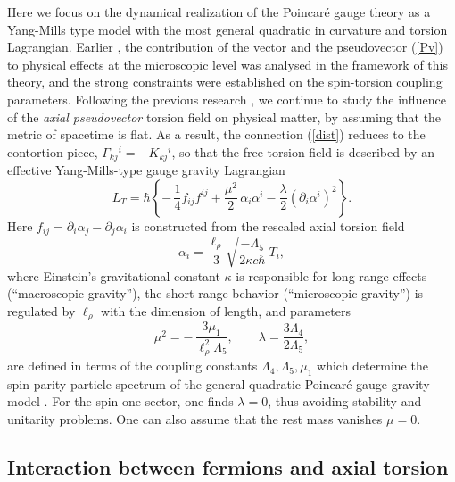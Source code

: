 \documentclass[12pt,prd,showkeys,amsmath,amssymb,nofootinbib]{revtex4-1}
\begin{document}
Here we focus on the dynamical realization of the Poincar\'e gauge theory as a Yang-Mills type model \cite{Poincare2} with the most general quadratic in curvature and torsion Lagrangian. Earlier \cite{Yakushin}, the contribution of the vector and the pseudovector (\ref{Pv}) to physical effects at the microscopic level was analysed in the framework of this theory, and the strong constraints were established on the spin-torsion coupling parameters. Following the previous research \cite{Yakushin}, we continue to study the influence of the {\it axial pseudovector} torsion field on physical matter, by assuming that the metric of spacetime is flat. As a result, the connection (\ref{dist}) reduces to the contortion piece, $\Gamma_{kj}{}^i = - K_{kj}{}^i$, so that the free torsion field is described by an effective Yang-Mills-type gauge gravity Lagrangian
\begin{equation}
L_T = \hbar\left\{-\,{\frac 14}f_{ij}f^{ij} + {\frac {\mu^2}2}\,\alpha_i\alpha^i
- {\frac \lambda 2}(\partial_i\alpha^i)^2\right\}.\label{LRTa}
\end{equation}
Here $f_{ij} = \partial_i\alpha_j - \partial_j\alpha_i$ is constructed from the rescaled axial torsion field
\begin{equation}\label{alpha}
\alpha_i = {\frac {\ell_\rho}{3}}\sqrt{\frac{-\Lambda_5}{2\kappa c\hbar}}\,\overline{T}_i,
\end{equation}
where Einstein's gravitational constant $\kappa$ is responsible for long-range effects (``macroscopic gravity''), the short-range behavior (``microscopic gravity'') is regulated by $\ell_\rho$ with the dimension of length, and parameters 
\begin{equation}\label{mula}
\mu^2 = -\,{\frac{3\mu_1}{\ell_\rho^2\Lambda_5}},\qquad \lambda = {\frac {3\Lambda_4}{2\Lambda_5}},
\end{equation}
are defined in terms of the coupling constants $\Lambda_4, \Lambda_5, \mu_1$ which determine the spin-parity particle spectrum of the general quadratic Poincar\'e gauge gravity model \cite{primer}. For the spin-one sector, one finds $\lambda = 0$, thus avoiding stability and unitarity problems. One can also assume that the rest mass vanishes $\mu = 0$. 


\subsection{Interaction between fermions and axial torsion}
\end{document}

